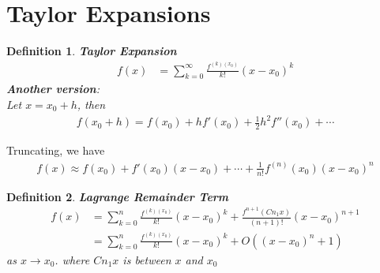 \documentclass[11pt,oneside]{book}
\theoremstyle{break}
\theoremstyle{break}
\newtheorem{defn}{Definition}[corL]
\begin{document}
\section[Taylor Expansions]{Taylor Expansions}
\begin{defn}
\textbf{Taylor Expansion} \begin{align*}
f(x)&=\sum_{k=0}^{\infty}\frac{f^{(k)(x_0)}}{k!}(x-x_0)^k
\end{align*}
\textbf{Another version}:\\
Let $x=x_0+h$, then \begin{align*}
f(x_0+h)=f(x_0)+hf'(x_0)+\frac{1}{2}h^2f''(x_0)+\cdots
\end{align*}
\end{defn}
Truncating, we have \begin{align*}
f(x)\approx f(x_0)+f'(x_0)(x-x_0)+\cdots+\frac{1}{n!}f^{(n)}(x_0)(x-x_0)^n
\end{align*}
\begin{defn}
\textbf{Lagrange Remainder Term}\\
\begin{align*}
f(x)&=\sum_{k=0}^{n}\frac{f^{(k)(x_0)}}{k!}(x-x_0)^k+\frac{f^{n+1}(Cn_1x)}{(n+1)!}(x-x_0)^{n+1}\\
&=\sum_{k=0}^{n}\frac{f^{(k)(x_0)}}{k!}(x-x_0)^k+O((x-x_0)^n+1)
\end{align*}
as $x\to x_0$. where $Cn_1x$ is between $x$ and $x_0$
\end{defn}
\end{document}
